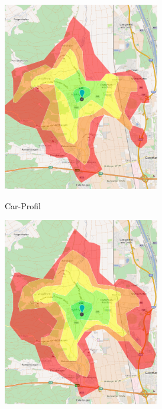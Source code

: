 \begin{figure}[h]
\begin{subfigure}{0.49\textwidth}
\includegraphics[width = 0.75\textwidth]{../media/isocar.png} \\
\caption{Car-Profil}
\label{fig:isocar}
\end{subfigure}
\begin{subfigure}{0.49\textwidth}
\centering
\includegraphics[width = 0.75\textwidth]{../media/isofire.png} \\

\end{subfigure}
\end{figure}
